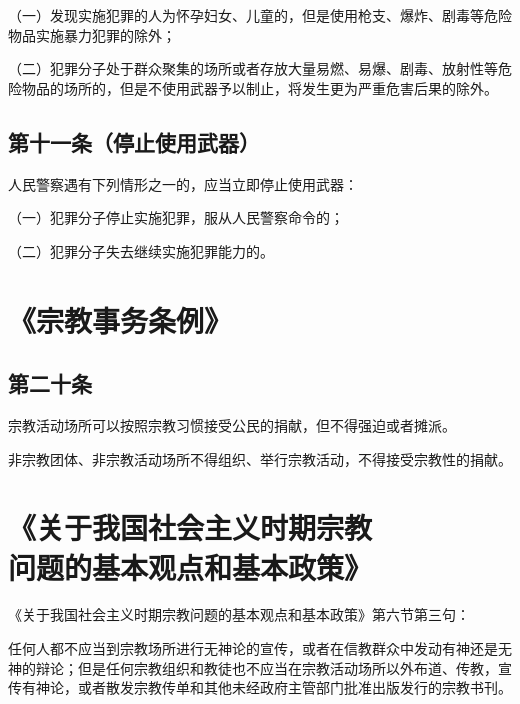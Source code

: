 \documentclass[utf-8,10pt]{ctexart}
\begin{document}
（一）发现实施犯罪的人为怀孕妇女、儿童的，但是使用枪支、爆炸、剧毒等危险物品实施暴力犯罪的除外；

（二）犯罪分子处于群众聚集的场所或者存放大量易燃、易爆、剧毒、放射性等危险物品的场所的，但是不使用武器予以制止，将发生更为严重危害后果的除外。
\subsection{第十一条（停止使用武器）}
人民警察遇有下列情形之一的，应当立即停止使用武器：

（一）犯罪分子停止实施犯罪，服从人民警察命令的；

（二）犯罪分子失去继续实施犯罪能力的。
\section{《宗教事务条例》}
\subsection{第二十条}
宗教活动场所可以按照宗教习惯接受公民的捐献，但不得强迫或者摊派。

非宗教团体、非宗教活动场所不得组织、举行宗教活动，不得接受宗教性的捐献。
\section{《关于我国社会主义时期宗教\\问题的基本观点和基本政策》}
\noindent 《关于我国社会主义时期宗教问题的基本观点和基本政策》第六节第三句：

任何人都不应当到宗教场所进行无神论的宣传，或者在信教群众中发动有神还是无神的辩论；但是任何宗教组织和教徒也不应当在宗教活动场所以外布道、传教，宣传有神论，或者散发宗教传单和其他未经政府主管部门批准出版发行的宗教书刊。
\end{document}

